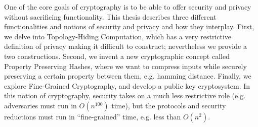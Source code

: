 % 
% 
%
One of the core goals of cryptography is to be able to offer security and privacy without sacrificing functionality. This thesis describes three different functionalities and notions of security and privacy and how they interplay. First, we delve into Topology-Hiding Computation, which has a very restrictive definition of privacy making it difficult to construct; nevertheless we provide a two constructions. Second, we invent a new cryptographic concept called Property Preserving Hashes, where we want to compress inputs while securely preserving a certain property between them, e.g. hamming distance. Finally, we explore Fine-Grained Cryptography, and develop a public key cryptosystem. In this notion of cryptography, security takes on a much less restrictive role (e.g. adversaries must run in $O(n^{100})$ time), but the protocols and security reductions must run in ``fine-grained'' time, e.g. less than $O(n^2)$.
